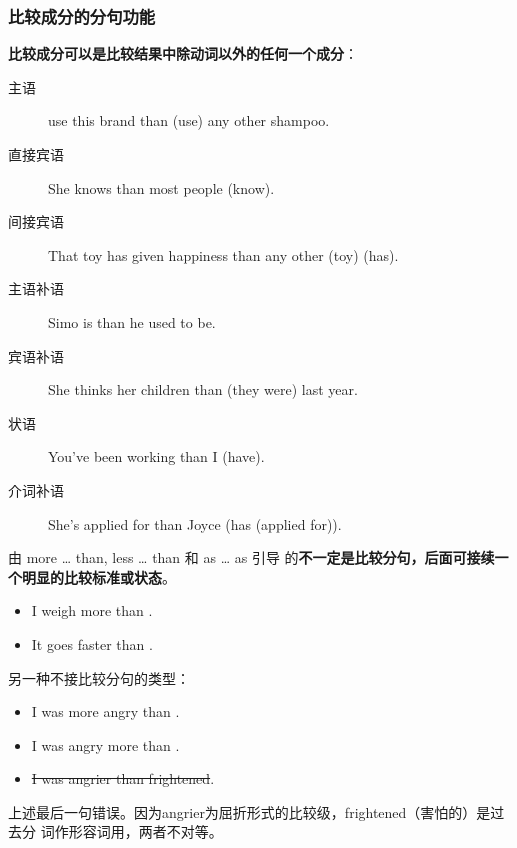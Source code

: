 \subsubsection{比较成分的分句功能}

\textbf{比较成分可以是比较结果中除动词以外的任何一个成分}：
\begin{description}
\item[主语]  use this brand than (use) any other shampoo.

\item[直接宾语] She knows  than most people (know).

\item[间接宾语] That toy has given  happiness than any other (toy) (has).

\item[主语补语] Simo is  than he used to be.

\item[宾语补语] She thinks her children  than (they were) last year.
\item[状语] You've been working  than I (have).

\item[介词补语] She's applied for  than Joyce (has (applied for)).
\end{description}

由 more \ldots{} than, less \ldots{} than 和 as \ldots{} as 引导
的\textbf{不一定是比较分句，后面可接续一个明显的比较标准或状态}。
\begin{itemize}
\item I weigh more than .

\item It goes faster than .

\end{itemize}

另一种不接比较分句的类型：
\begin{itemize}
\item I was more angry than .
\item I was angry more  than .

\item \sout{I was angrier than frightened}.
\end{itemize}
上述最后一句错误。因为angrier为屈折形式的比较级，frightened（害怕的）是过去分
词作形容词用，两者不对等。

